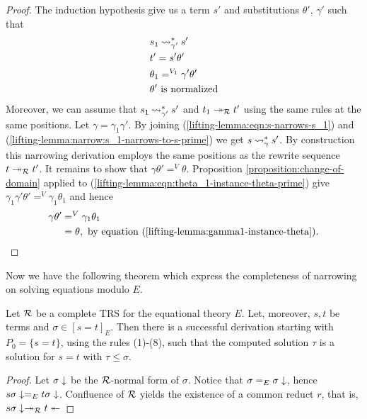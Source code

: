 \begin{lemma}
\begin{proof}
		The induction hypothesis give us a term $s'$ and substitutions $\theta'$, $\gamma'$ such that
		\begin{align}
			 & s_1 \mathbin{\rightsquigarrow}_{\gamma'}^{*} s' \label{lifting-lemma:narrow:s_1-narrows-to-s-prime}       \\
			 & t' = s'\theta'                                                                         \\
			 & \theta_1 =^{V_1} \gamma'\theta' \label{lifting-lemma:eqn:theta_1-instance-theta-prime} \\
			 & \theta' \text{ is normalized} \label{lifting-lemma:eqn:theta-prime-is-normalized}
		\end{align}
		Moreover, we can assume that $s_1 \mathbin{\rightsquigarrow}_{\gamma'}^{*} s'$ and $t_1 \twoheadrightarrow_{\small{\mathcal{R}}} t'$ using the same rules at the same positions. Let $\gamma = \gamma_1 \gamma'$. By joining (\ref{lifting-lemma:eqn:s-narrows-s_1}) and (\ref{lifting-lemma:narrow:s_1-narrows-to-s-prime}) we get $s \mathbin{\rightsquigarrow}_{\gamma}^{*} s'$. By construction this narrowing derivation employs the same positions as the rewrite sequence $t \twoheadrightarrow_{\small{\mathcal{R}}} t'$. It remains to show that $\gamma \theta' =^V \theta$. Proposition \ref{proposition:change-of-domain} applied to (\ref{lifting-lemma:eqn:theta_1-instance-theta-prime}) give $\gamma_1 \gamma'\theta' =^V \gamma_1\theta_1$ and hence
		\begin{align*}
			\gamma \theta' & =^V \gamma_1\theta_1                                                       \\
			               & = \theta, \text{ by equation (\ref{lifting-lemma:gamma1-instance-theta}).}
		\end{align*}
	\end{proof}
\end{lemma}

Now we have the following theorem which express the completeness of narrowing on solving equations modulo $E$.
\begin{theorem}\label{theorem:narrowing-completeness}
    Let $\mathcal{R}$ be a complete TRS for the equational theory $E$. Let, moreover, $s, t$ be terms and $\sigma \in [s = t]_E$. Then there is a successful derivation starting with $P_0 = \{ s = t \}$, using the rules (1)-(8), such that the computed solution $\tau$ is a solution for $s = t$ with $\tau \leq \sigma$.

    \begin{proof}
        Let $\sigma\downarrow$ be the $\mathcal{R}$-normal form of $\sigma$. Notice that $\sigma =_{E} \sigma\downarrow$, hence $s \sigma\downarrow =_{E} t \sigma\downarrow$. Confluence of $\mathcal{R}$ yields the existence of a common reduct $r$, that is, $s\sigma\downarrow \twoheadrightarrow_{\small{\mathcal{R}}} t \twoheadleftarrow $
    \end{proof}

\end{theorem}



